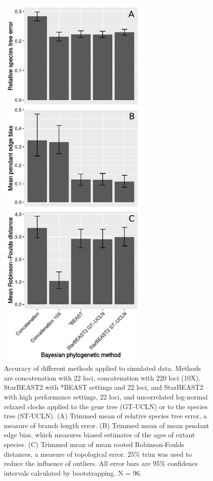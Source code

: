 \documentclass[nogrid]{MBE}%
\begin{document}
\begin{figure}[htb!]
\centering
\includegraphics[width=7.5cm]{tree_error.pdf}
\caption
{Accuracy of different methods applied to simulated data. Methods are concatenation with 22 loci, concatenation with 220 loci
(10X), StarBEAST2 with *BEAST settings and 22 loci, and StarBEAST2 with
high performance settings, 22 loci, and uncorrelated log-normal relaxed clocks applied
to the gene tree (GT-UCLN) or to the species tree (ST-UCLN). (A) Trimmed mean of
relative species tree error, a measure of branch length error. (B) Trimmed
mean of mean pendant edge bias, which measures biased estimates of the ages of
extant species. (C) Trimmed mean of mean rooted Robinson-Foulds distances, a
measure of topological error. 25\% trim was used to reduce the
influence of outliers. All error bars are 95\% confidence intervals calculated
by bootstrapping. N = 96.}
\label{fig:speciesTreeError}
\end{figure}
\end{document}
